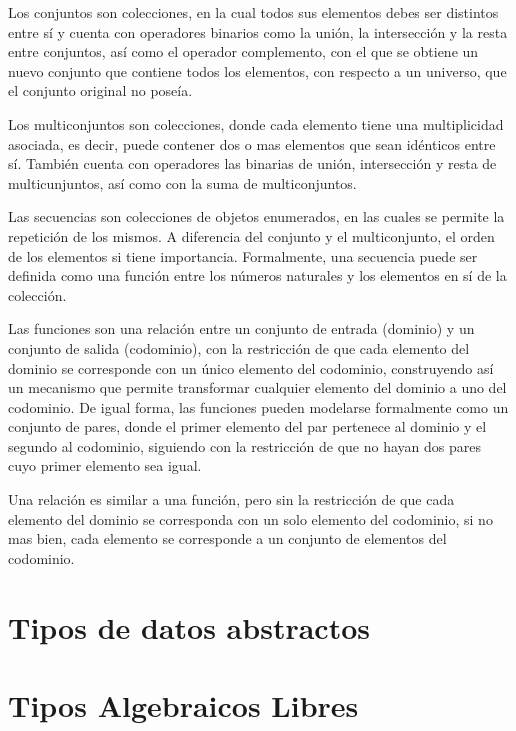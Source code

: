 \begin{enumerate}[label=\emph{}]
  Los conjuntos son colecciones, en la cual todos sus
 elementos debes ser distintos entre sí y cuenta con operadores binarios como
 la unión, la intersección y la resta entre conjuntos, así como el operador
 complemento, con el que se obtiene un nuevo conjunto que contiene todos los
 elementos, con respecto a un universo, que el conjunto original no poseía.

  Los multiconjuntos son colecciones, donde cada elemento
 tiene una multiplicidad asociada, es decir, puede contener dos o mas elementos
 que sean idénticos entre sí. También cuenta con operadores las binarias de unión,
 intersección y resta de multicunjuntos, así como con la suma de
 multiconjuntos.

  Las secuencias son colecciones de objetos enumerados, en las cuales
 se permite la repetición de los mismos. A diferencia del conjunto y el
 multiconjunto, el orden de los elementos si tiene importancia. Formalmente,
 una secuencia puede ser definida como una función entre los números naturales
 y los elementos en sí de la colección.

  Las funciones son una relación entre un conjunto de entrada (dominio) y
 un conjunto de salida (codominio), con la restricción de que cada elemento
 del dominio se corresponde con un único elemento del codominio, construyendo
 así un mecanismo que permite transformar cualquier elemento del dominio a uno
 del codominio. De igual forma, las funciones pueden modelarse formalmente
 como un conjunto de pares, donde el primer elemento del par pertenece al
 dominio y el segundo al codominio, siguiendo con la restricción de que no
 hayan dos pares cuyo primer elemento sea igual.

  Una relación es similar a una función, pero sin la
 restricción de que cada elemento del dominio se corresponda con un solo
 elemento del codominio, si no mas bien, cada elemento se corresponde a un
 conjunto de elementos del codominio.

\end{enumerate}

\section{Tipos de datos abstractos}

\section{Tipos Algebraicos Libres}

